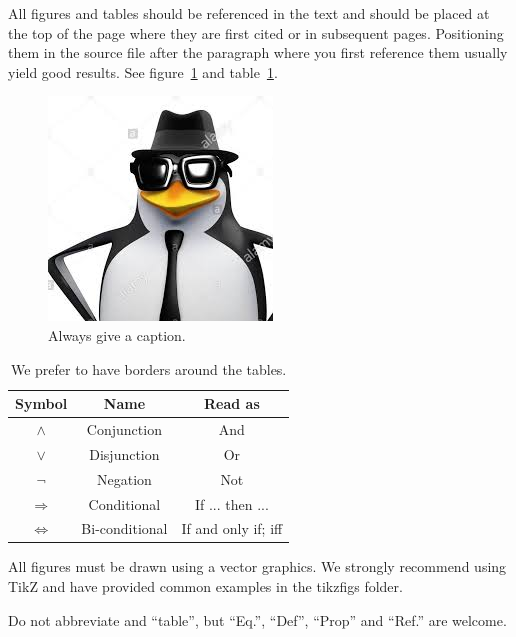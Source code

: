 All figures and tables should be referenced in the text and should be
placed at the top of the page where they are first cited or in
subsequent pages. Positioning them in the source file
after the paragraph where you first reference them usually yield good
results. See figure~\ref{fig:i} and table~\ref{mod1:tab:LogicSymbols}.

\begin{figure}[tbp]
   \centering %
   \includegraphics[width=.5\textwidth]{images.jpeg}
   \caption{\label{fig:i} Always give a caption.}
\end{figure}

\begin{table}[ht]
   \centering
   \begin{tabular}{|c|c|c|}
      \hline
         Symbol & Name & Read as\\
      \hline
      $\land$ & Conjunction & And \\
      $\lor$ & Disjunction & Or \\
      $\lnot$ & Negation & Not\\
      $\Rightarrow$ & Conditional & If ... then ...\\
      $\Leftrightarrow$ & Bi-conditional & If and only if; iff\\
      \hline
   \end{tabular}
    \caption{\label{mod1:tab:LogicSymbols} We prefer to have borders around the tables.}
\end{table}

All figures must be drawn using a vector graphics. We strongly recommend using
TikZ and have provided common examples in the tikzfigs folder.   

Do not abbreviate and ``table'', 
but ``Eq.'', ``Def'', ``Prop'' and ``Ref.'' are welcome.